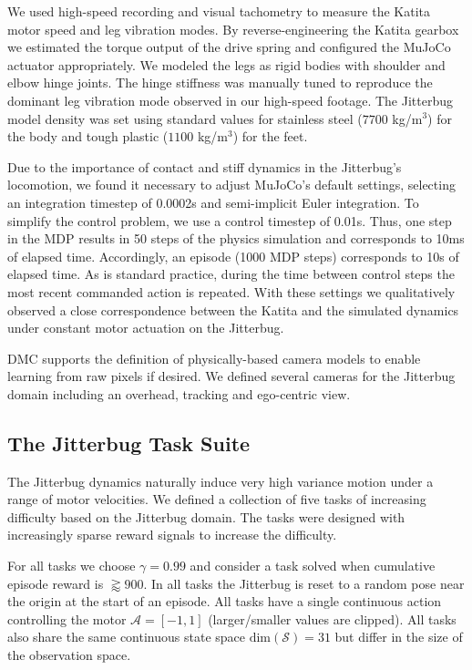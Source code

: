 \documentclass[letterpaper, 10 pt, conference]{ieeeconf}
\begin{document}
We used high-speed recording and visual tachometry to measure the Katita motor speed and leg vibration modes.
By reverse-engineering the Katita gearbox we estimated the torque output of the drive spring and configured the MuJoCo actuator appropriately.
We modeled the legs as rigid bodies with shoulder and elbow hinge joints.
The hinge stiffness was manually tuned to reproduce the dominant leg vibration mode observed in our high-speed footage.
The Jitterbug model density was set using standard values for stainless steel ($7700$ kg/m$^3$) for the body and tough plastic ($1100$ kg/m$^3$) for the feet.

Due to the importance of contact and stiff dynamics in the Jitterbug's locomotion, we found it necessary to adjust MuJoCo's default settings, selecting an integration timestep of 0.0002s and semi-implicit Euler integration.
To simplify the control problem, we use a control timestep of 0.01s.
Thus, one step in the MDP results in 50 steps of the physics simulation and corresponds to 10ms of elapsed time.
Accordingly, an episode (1000 MDP steps) corresponds to 10s of elapsed time.
As is standard practice, during the time between control steps the most recent commanded action is repeated.
With these settings we qualitatively observed a close correspondence between the Katita and the simulated dynamics under constant motor actuation on the Jitterbug.

DMC supports the definition of physically-based camera models to enable learning from raw pixels if desired.
We defined several cameras for the Jitterbug domain including an overhead, tracking and ego-centric view.

\subsection{The Jitterbug Task Suite}\label{sec:jt}

The Jitterbug dynamics naturally induce very high variance motion under a range of motor velocities.
We defined a collection of five tasks of increasing difficulty based on the Jitterbug domain.
The tasks were designed with increasingly sparse reward signals to increase the difficulty.

For all tasks we choose $\gamma = 0.99$ and consider a task solved when cumulative episode reward is $\gtrapprox 900$.
In all tasks the Jitterbug is reset to a random pose near the origin at the start of an episode.
All tasks have a single continuous action controlling the motor $\mathcal{A} = [-1, 1]$ (larger/smaller values are clipped).
All tasks also share the same continuous state space $\text{dim}(\mathcal{S}) = 31$ but differ in the size of the observation space.
\end{document}
